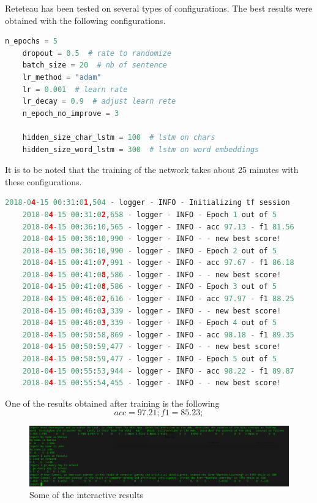 Reteteau has been tested on several types of configurations. The best results were obtained with the following configurations.

\begin{lstlisting}[language=Python,caption={Network configurations}]
    n_epochs = 5
    dropout = 0.5  # rate to randomize
    batch_size = 20  # nb of sentence
    lr_method = "adam"
    lr = 0.001  # learn rate
    lr_decay = 0.9  # adjust learn rete
    n_epoch_no_improve = 3

    hidden_size_char_lstm = 100  # lstm on chars
    hidden_size_word_lstm = 300  # lstm on word embeddings
\end{lstlisting}

It is to be noted that the training of the network takes about 25 minutes with these configurations.

\begin{lstlisting}[language=Python,caption={Network results during training}]
    2018-04-15 00:31:01,504 - logger - INFO - Initializing tf session
    2018-04-15 00:31:02,658 - logger - INFO - Epoch 1 out of 5
    2018-04-15 00:36:10,565 - logger - INFO - acc 97.13 - f1 81.56
    2018-04-15 00:36:10,990 - logger - INFO - - new best score!
    2018-04-15 00:36:10,990 - logger - INFO - Epoch 2 out of 5
    2018-04-15 00:41:07,991 - logger - INFO - acc 97.67 - f1 86.18
    2018-04-15 00:41:08,586 - logger - INFO - - new best score!
    2018-04-15 00:41:08,586 - logger - INFO - Epoch 3 out of 5
    2018-04-15 00:46:02,616 - logger - INFO - acc 97.97 - f1 88.25
    2018-04-15 00:46:03,339 - logger - INFO - - new best score!
    2018-04-15 00:46:03,339 - logger - INFO - Epoch 4 out of 5
    2018-04-15 00:50:58,869 - logger - INFO - acc 98.18 - f1 89.35
    2018-04-15 00:50:59,477 - logger - INFO - - new best score!
    2018-04-15 00:50:59,477 - logger - INFO - Epoch 5 out of 5
    2018-04-15 00:55:53,944 - logger - INFO - acc 98.22 - f1 89.87
    2018-04-15 00:55:54,455 - logger - INFO - - new best score!
\end{lstlisting}

One of the results obtained after training is the following
\begin{equation*}
    acc = 97.21;
    f1 = 85.23;
\end{equation*}


\begin{figure}[H]
  \centering
  \includegraphics[width=6.5in]{images/interactive.png}
  \caption {Some of the interactive results}
\end{figure}

